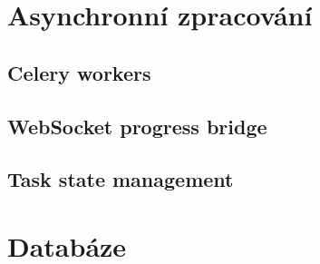 
\section{Asynchronní zpracování}
\label{sec:async_impl}


\subsection{Celery workers}


\subsection{WebSocket progress bridge}


\subsection{Task state management}


\section{Databáze}
\label{sec:databaze}


